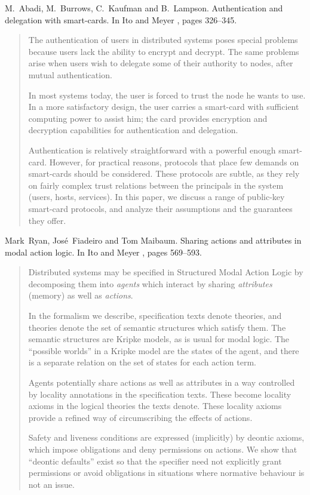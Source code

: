 \begin{thebibliography}{10}
M.~Abadi, M.~Burrows, C.~Kaufman and B.~Lampson.
\newblock Authentication and delegation with smart-cards.
\newblock In Ito and Meyer \cite{TACS91}, pages 326--345.
\begin{quotation}
The authentication of users in distributed systems poses special problems
  because users lack the ability to encrypt and decrypt. The same problems
  arise when users wish to delegate some of their authority to nodes, after
  mutual authentication. \par In most systems today, the user is forced to
  trust the node he wants to use. In a more satisfactory design, the user
  carries a smart-card with sufficient computing power to assist him; the card
  provides encryption and decryption capabilities for authentication and
  delegation. \par Authentication is relatively straightforward with a powerful
  enough smart-card. However, for practical reasons, protocols that place few
  demands on smart-cards should be considered. These protocols are subtle, as
  they rely on fairly complex trust relations between the principals in the
  system (users, hosts, services). In this paper, we discuss a range of
  public-key smart-card protocols, and analyze their assumptions and the
  guarantees they offer.
\end{quotation}

Mark~Ryan, Jos\'e~Fiadeiro and Tom Maibaum.
\newblock Sharing actions and attributes in modal action logic.
\newblock In Ito and Meyer \cite{TACS91}, pages 569--593.
\begin{quotation}
Distributed systems may be specified in Structured Modal Action Logic by
  decomposing them into {\em agents\/} which interact by sharing {\em
  attributes\/} (memory) as well as {\em actions}. \par In the formalism we
  describe, specification texts denote theories, and theories denote the set of
  semantic structures which satisfy them. The semantic structures are Kripke
  models, as is usual for modal logic. The ``possible worlds'' in a Kripke
  model are the states of the agent, and there is a separate relation on the
  set of states for each action term. \par Agents potentially share actions as
  well as attributes in a way controlled by locality annotations in the
  specification texts. These become locality axioms in the logical theories the
  texts denote. These locality axioms provide a refined way of circumscribing
  the effects of actions. \par Safety and liveness conditions are expressed
  (implicitly) by deontic axioms, which impose obligations and deny permissions
  on actions. We show that ``deontic defaults'' exist so that the specifier
  need not explicitly grant permissions or avoid obligations in situations
  where normative behaviour is not an issue.
\end{quotation}


\end{thebibliography}
